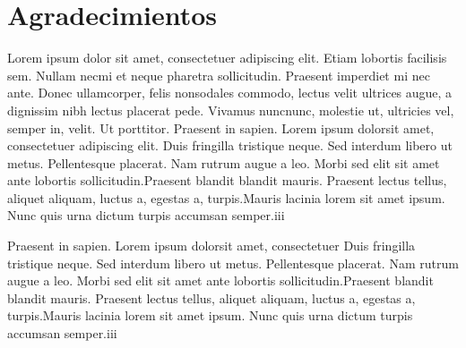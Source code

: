 \chapter{Agradecimientos}
Lorem ipsum dolor sit amet, consectetuer adipiscing elit. 
Etiam lobortis facilisis sem. Nullam necmi  et  neque  
pharetra  sollicitudin.  Praesent  imperdiet  mi  nec  
ante.  Donec  ullamcorper,  felis  nonsodales commodo, 
lectus velit ultrices augue, a dignissim nibh lectus 
placerat pede. Vivamus nuncnunc, molestie ut, ultricies 
vel, semper in, velit. Ut porttitor. Praesent in sapien.
Lorem ipsum dolorsit amet, consectetuer adipiscing elit. 
Duis fringilla tristique neque. Sed interdum libero ut metus.
Pellentesque placerat. Nam rutrum augue a leo. Morbi sed 
elit sit amet ante lobortis sollicitudin.Praesent blandit 
blandit mauris. Praesent lectus tellus, aliquet aliquam,
luctus a, egestas a, turpis.Mauris lacinia lorem sit amet
ipsum. Nunc quis urna dictum turpis accumsan semper.iii

Praesent in sapien. Lorem ipsum dolorsit amet, consectetuer 
Duis fringilla tristique neque. Sed interdum libero ut metus.
Pellentesque placerat. Nam rutrum augue a leo. Morbi sed 
elit sit amet ante lobortis sollicitudin.Praesent blandit 
blandit mauris. Praesent lectus tellus, aliquet aliquam,
luctus a, egestas a, turpis.Mauris lacinia lorem sit amet
ipsum. Nunc quis urna dictum turpis accumsan semper.iii